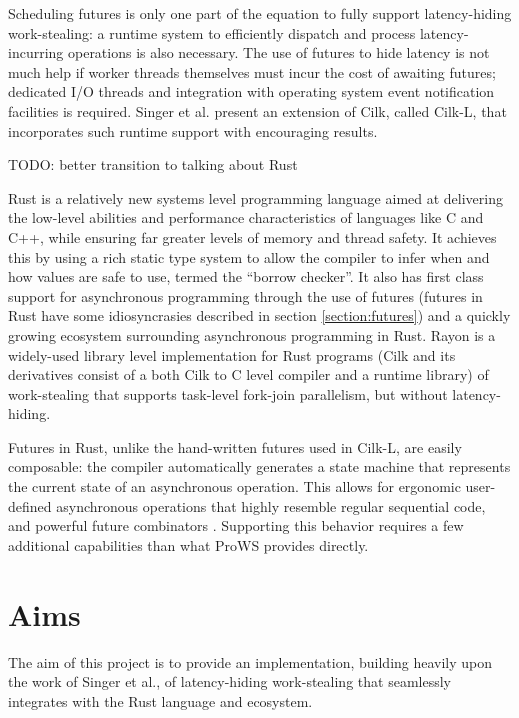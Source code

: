 \documentclass[bsc,frontabs,singlespacing,parskip,deptreport,normalheadings]{infthesis}
\begin{document}
Scheduling futures is only one part of the equation to fully support
latency-hiding work-stealing: a runtime system to efficiently dispatch and
process latency-incurring operations is also necessary. The use of futures to
hide latency is not much help if worker threads themselves must incur the cost
of awaiting futures; dedicated I/O threads and integration with operating system
event notification facilities is required. Singer et al.
\cite{singer_scheduling_2019} present an extension of Cilk, called Cilk-L, that
incorporates such runtime support with encouraging results.

TODO: better transition to talking about Rust

Rust \cite{matsakis_rust_2014} is a relatively new systems level programming
language aimed at delivering the low-level abilities and performance
characteristics of languages like C and C++, while ensuring far greater levels
of memory and thread safety. It achieves this by using a rich static type
system to allow the compiler to infer when and how values are safe to use,
termed the ``borrow checker''. It also has first class support for asynchronous
programming through the use of futures (futures in Rust have some idiosyncrasies
described in section \ref{section:futures}) and a quickly growing
ecosystem surrounding asynchronous programming in Rust. Rayon
\cite{noauthor_rayon_2022, noauthor_baby_nodate, stone_how_2021} is a
widely-used library level implementation for Rust programs (Cilk and its
derivatives consist of a both Cilk to C level compiler and a runtime library) of
work-stealing that supports task-level fork-join parallelism, but without
latency-hiding.

Futures in Rust, unlike the hand-written futures used in Cilk-L, are easily
composable: the compiler automatically generates a state machine that represents
the current state of an asynchronous operation. This allows for ergonomic
user-defined asynchronous operations that highly resemble regular sequential
code, and powerful future combinators \cite{noauthor_futuresfuture_nodate}.
Supporting this behavior requires a few additional capabilities than what ProWS
provides directly.

\section{Aims}

The aim of this project is to provide an implementation, building heavily upon
the work of Singer et al., of latency-hiding work-stealing that seamlessly
integrates with the Rust language and ecosystem.
\end{document}
